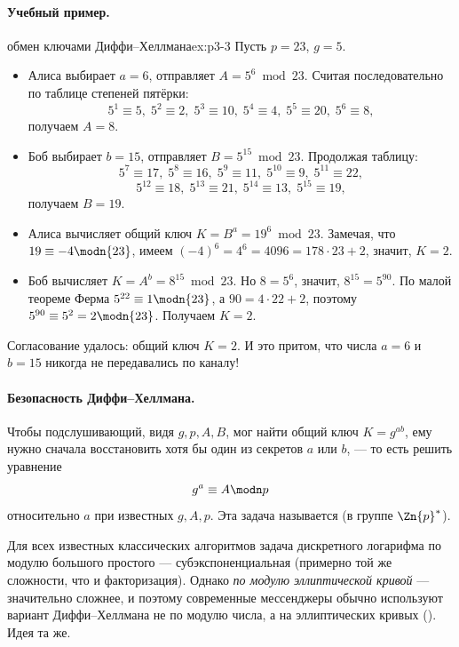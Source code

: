 \paragraph*{Учебный пример.}

\begin{example}{обмен ключами Диффи--Хеллмана}{ex:p3-3}
Пусть $p = 23$, $g = 5$.
\begin{itemize}
  \item Алиса выбирает $a = 6$, отправляет $A = 5^6 \bmod 23$. Считая последовательно по таблице степеней пятёрки:
  \[
  5^1\equiv 5,\;5^2\equiv 2,\;5^3\equiv 10,\;5^4\equiv 4,\;5^5\equiv 20,\;5^6\equiv 8,
  \]
  получаем $A = 8$.
  \item Боб выбирает $b = 15$, отправляет $B = 5^{15} \bmod 23$. Продолжая таблицу:
  \[
  5^7\equiv 17,\;5^8\equiv 16,\;5^9\equiv 11,\;5^{10}\equiv 9,\;5^{11}\equiv 22,
  \]
  \[
  5^{12}\equiv 18,\;5^{13}\equiv 21,\;5^{14}\equiv 13,\;5^{15}\equiv 19,
  \]
  получаем $B = 19$.
  \item Алиса вычисляет общий ключ $K = B^a = 19^6 \bmod 23$. Замечая, что $19 \equiv -4 \modn{23}$, имеем $(-4)^6 = 4^6 = 4096 = 178\cdot 23 + 2$, значит, $K = 2$.
  \item Боб вычисляет $K = A^b = 8^{15} \bmod 23$. Но $8 = 5^6$, значит, $8^{15} = 5^{90}$. По малой теореме Ферма $5^{22} \equiv 1 \modn{23}$, а $90 = 4\cdot 22 + 2$, поэтому $5^{90} \equiv 5^2 = 2 \modn{23}$. Получаем $K = 2$.
\end{itemize}

Согласование удалось: общий ключ $K = 2$. И это притом, что числа $a = 6$ и $b = 15$ никогда не передавались по каналу!
\end{example}

\paragraph*{Безопасность Диффи--Хеллмана.} Чтобы подслушивающий, видя $g, p, A, B$, мог найти общий ключ $K = g^{ab}$, ему нужно сначала восстановить хотя бы один из секретов $a$ или $b$, --- то есть решить уравнение
\[
g^a \equiv A \modn p
\]
относительно $a$ при известных $g, A, p$. Эта задача называется  (в группе $\Zn{p}^*$).

\begin{importantbox}
Для всех известных классических алгоритмов задача дискретного логарифма по модулю большого простого --- субэкспоненциальная (примерно той же сложности, что и факторизация). Однако \emph{по модулю эллиптической кривой} --- значительно сложнее, и поэтому современные мессенджеры обычно используют вариант Диффи--Хеллмана не по модулю числа, а на эллиптических кривых (). Идея та же.
\end{importantbox}

